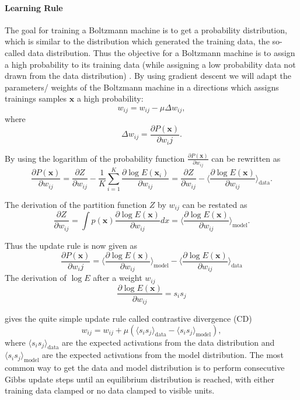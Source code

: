 \paragraph{Learning Rule}

The goal for training a Boltzmann machine is to get a probability distribution, which is similar to the distribution which generated the training data, the so-called data distribution.
Thus the objective for a Boltzmann machine is to assign a high probability to its training data (while assigning a low probability data not drawn from the data distribution) \cite{ackley1985learning} \cite{hinton2002training} \cite{Woodford2002} \cite{Bengio2009}.
By using gradient descent we will adapt the parameters/ weights of the Boltzmann machine in a directions which assigns trainings samples $\textbf{x}$ a high probability:
\[
w_{ij} = w_{ij} - \mu \Delta w_{ij},
\]
where
\[
\Delta w_{ij} = \frac{\partial P(\textbf{x})}{\partial w_ij}.
\]

By using the logarithm of the probability function $\frac{\partial P(\textbf{x})}{\partial w_{ij}}$ can be rewritten as
\[
\frac{\partial P(\textbf{x})}{\partial w_{ij}} = \frac{\partial Z}{\partial w_{ij}} - \frac{1}{K} \sum_{i=1}^K \frac{\partial \log E(\textbf{x}_i)}{\partial w_{ij}} =  \frac{\partial Z}{\partial w_{ij}} - \Big \langle \frac{\partial \log E(\textbf{x})}{\partial w_{ij}} \Big \rangle_{\text{data}}.
\]    

The derivation of the partition function $Z$ by $w_{ij}$ can be restated as
\[
 \frac{\partial Z}{\partial w_{ij}} = \int p(\textbf{x}) \frac{\partial \log E(\textbf{x})}{\partial w_{ij}} dx = \Big \langle \frac{\partial \log E(\textbf{x})}{\partial w_{ij}} \Big \rangle_{\text{model}}.
\]

Thus the update rule is now given as
\[
\frac{\partial P(\textbf{x})}{\partial w_ij} =  \Big \langle \frac{\partial \log E(\textbf{x})}{\partial w_{ij}} \Big \rangle_{\text{model}} - \Big \langle \frac{\partial \log E(\textbf{x})}{\partial w_{ij}} \Big \rangle_{\text{data}}
\]
The derivation of $\log E$ after a weight $w_{ij}$
\[
\frac{\partial \log E(\textbf{x})}{\partial w_{ij}} = s_i s_j
\]

gives the quite simple update rule called contrastive divergence (CD)
\[
w_{ij}= w_{ij} + \mu ( \langle s_i s_j \rangle_{\text{data}} - \langle s_i s_j \rangle_{\text{model}} ) ,
\]
where $\langle s_i s_j \rangle_{\text{data}}$ are the expected activations from the data distribution and  $ \langle s_i s_j \rangle_{\text{model}}$ are the expected activations from the model distribution.
The most common way to get the data and model distribution is to perform consecutive Gibbs update steps until an equilibrium distribution is reached, with either training data clamped or no data clamped to visible units.

